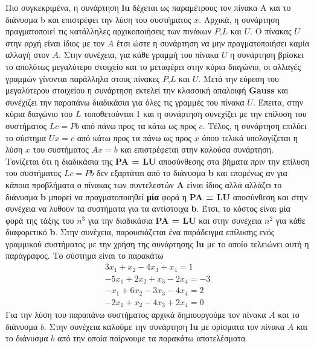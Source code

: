 \documentclass[First Project.tex]{subfiles}
\begin{document}
Πιο συγκεκριμένα, η συνάρτηση \textlatin{\textbf{lu}} δέχεται ως παραμέτρους τον πίνακα \textlatin{A} και το διάνυσμα \textlatin{b} και
επιστρέφει την λύση του συστήματος $x$. Αρχικά, η συνάρτηση πραγματοποιεί τις κατάλληλες αρχικοποιήσεις των πινάκων $P$,$L$ και $U$. Ο πίνακας
$U$ στην αρχή είναι ίδιος με τον $A$ έτσι ώστε η συνάρτηση να μην πραγματοποιήσει καμία αλλαγή στον $A$. Στην συνέχεια, για κάθε γραμμή του 
πίνακα $U$ η συνάρτηση βρίσκει το απολύτως μεγαλύτερο στοιχείο και το μεταφέρει στην κύρια διαγώνιο, οι αλλαγές γραμμών γίνονται παράλληλα στους
πίνακες $P$,$L$ και $U$. Μετά την εύρεση του μεγαλύτερου στοιχείου η συνάρτηση εκτελεί την κλασσική απαλοιφή \textlatin{\textbf{Gauss}} και
συνέχιζει την παραπάνω διαδικάσια για όλες τις γραμμές του πίνακα $U$. Έπειτα, στην κύρια διαγώνιο του $L$ τοποθετούνται 1 και η συνάρτηση 
συνεχίζει με την επίλυση του συστήματος $Lc = Pb$ από πάνω προς τα κάτω ως προς $c$. Τέλος, η συνάρτηση επιλύει το σύστημα $Ux = c$ από κάτω
προς τα πάνω ως προς $x$ όπου τελικά υπολογίζεται η λύση $x$ του συστήματος $Ax = b$ και επιστρέφεται στην καλούσα συνάρτηση. Τονίζεται ότι
η διαδικάσια της \textlatin{\textbf{PA = LU}} αποσύνθεσης στα βήματα πριν την επίλυση του συστήματος $Lc = Pb$ δεν εξαρτάται από το διάνυσμα 
\textlatin{\textbf{b}} και επομένως αν για κάποια προβλήματα ο πίνακας των συντελεστών \textlatin{\textbf{A}} είναι ίδιος αλλά αλλάζει το 
διάνυσμα \textlatin{\textbf{b}} μπορεί να πραγματοποιηθεί \textbf{μία} φορά η \textlatin{\textbf{PA = LU}} αποσύνθεση και στην συνέχεια να
λυθούν τα συστήματα για τα αντίστοιχα \textlatin{\textbf{b}}. Έτσι, το κόστος είναι μία φορά της τάξης του $n^{3}$ για την διαδικάσια
\textlatin{\textbf{PA = LU}} και στην συνέχεια $n^{2}$ για κάθε διαφορετικό \textlatin{\textbf{b}}. Στην συνέχεια, παρουσιάζεται ένα παράδειγμα
επίλυσης ενός γραμμικού συστήματος με την χρήση της συνάρτησης \textlatin{\textbf{lu}} με το οποίο τελειώνει αυτή η παράγραφος. Το σύστημα είναι
το παρακάτω 
\begin{gather*}
    3x_{1} + x_{2} - 4x_{3} + x_{4} = 1 \\
    -5x_{1} + 2x_{2} + x_{3} - 2x_{4} = -3 \\
    -x_{1} + 6x_{2} - 3x_{3} - 4x_{4} = 2 \\
    -2x_{1} + x_{2} - 4x_{3} + 2x_{4} = 0
\end{gather*}
Για την λύση του παραπάνω συστήματος αρχικά δημιουργούμε τον πίνακα $A$ και το διάνυσμα $b$. Στην συνέχεια καλούμε την συνάρτηση 
\textlatin{\textbf{lu}} με ορίσματα τον πίνακα $Α$ και το διάνυσμα $b$ από την οποία παίρνουμε τα παρακάτω αποτελέσματα
\end{document}
